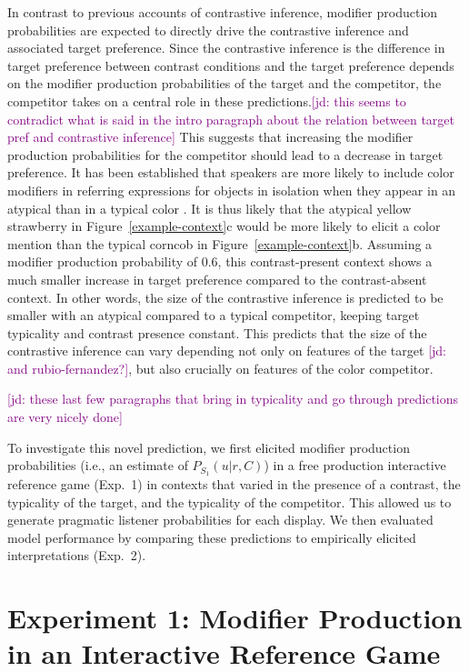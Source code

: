 \documentclass[10pt,letterpaper]{article}
\newcommand{\jd}[1]{\textcolor{Purple}{[jd: #1]}}
\begin{document}
In contrast to previous accounts of contrastive inference, modifier production probabilities are expected to directly drive the contrastive inference and associated target preference. Since the contrastive inference is the difference in target preference between contrast conditions and the target preference depends on the modifier production probabilities of the target and the competitor, the competitor takes on a central role in these predictions.\jd{this seems to contradict what is said in the intro paragraph about the relation between target pref and contrastive inference} This suggests that increasing the modifier production probabilities for the competitor should lead to a decrease in target preference. It has been established that speakers are more likely to include color modifiers in referring expressions for objects in isolation when they appear in an atypical than in a typical color \cite{Rubio-Fernandez:2016,Westerbeek:2015,Degen:inpress}. It is thus likely that the atypical yellow strawberry in Figure~\ref{example-context}c would be more likely to elicit a color mention than the typical corncob in Figure~\ref{example-context}b. Assuming a modifier production probability of 0.6, this contrast-present context shows a much smaller increase in target preference compared to the contrast-absent context. In other words, the size of the contrastive inference is predicted to be smaller with an atypical compared to a typical competitor, keeping target typicality and contrast presence constant. This predicts that the size of the contrastive inference can vary depending not only on features of the target \cite<as previously shown by>{Sedivy:2003}\jd{and rubio-fernandez?}, but also crucially on features of the color competitor. 

\jd{these last few paragraphs that bring in typicality and go through predictions are very nicely done}

To investigate this novel prediction, we first elicited modifier production probabilities (i.e., an estimate of $P_{S_1}(u|r,C)$) in a free production interactive reference game (Exp.~1) in contexts that varied in the presence of a contrast, the typicality of the target, and the typicality of the competitor. This allowed us to generate pragmatic listener probabilities for each display. We then evaluated model performance by comparing these predictions to empirically elicited interpretations (Exp.~2).


\section{Experiment 1: Modifier Production in an Interactive Reference Game}
\end{document}
